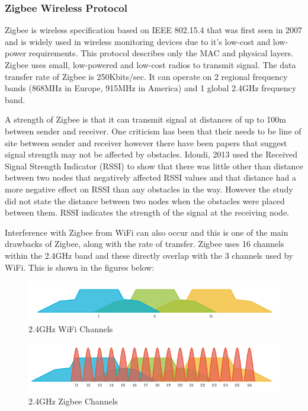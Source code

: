 \documentclass[10pt,a4paper]{article}
\begin{document}
\subsubsection{Zigbee Wireless Protocol}
Zigbee is wireless specification based on IEEE 802.15.4 that was first seen in 2007 and is widely used in wireless monitoring devices due to it's low-cost and low-power requirements. This protocol describes only the MAC and physical layers\cite{Elarabi2015}. Zigbee uses small, low-powered and low-cost radios to transmit signal. The data transfer rate of Zigbee is 250Kbits/sec. It can operate on 2 regional frequency bands (868MHz in Europe, 915MHz in America) and 1 global 2.4GHz frequency band\cite{ZigbeeAlliance}. 

A strength of Zigbee is that it can transmit signal at distances of up to 100m between sender and receiver. One criticism has been that their needs to be line of site between sender and receiver however there have been papers that suggest signal strength may not be affected by obstacles. Idoudi, 2013 used the Received Signal Strength Indicator (RSSI) to show that there was little other than distance between two nodes that negatively affected RSSI values and that distance had a more negative effect on RSSI than any obstacles in the way\cite{Idoudi2013}. However the study did not state the distance between two nodes when the obstacles were placed between them. RSSI indicates the strength of the signal at the receiving node. 

Interference with Zigbee from WiFi can also occur and this is one of the main drawbacks of Zigbee, along with the rate of transfer. Zigbee uses 16 channels within the 2.4GHz band and these directly overlap with the 3 channels used by WiFi. This is shown in the figures below:

\begin{figure}[H]
\centering
  \includegraphics[width=\linewidth]{images/wifi_channels.png}
  \caption{2.4GHz WiFi Channels\cite{zigbeechannels}}
  \label{fig:wifichannels}
\end{figure}

\begin{figure}[H]
\centering
  \includegraphics[width=\linewidth]{images/zigbee_channels.png}
  \caption{2.4GHz Zigbee Channels\cite{zigbeechannels}}
  \label{fig:zigbeechannels}
\end{figure}
\end{document}
